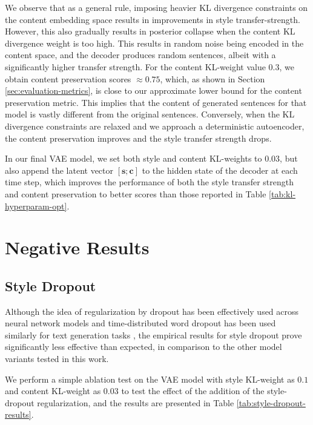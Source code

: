 We observe that as a general rule, imposing heavier KL divergence constraints on the content embedding space results in improvements in style transfer-strength. However, this also gradually results in posterior collapse when the content KL divergence weight is too high. This results in random noise being encoded in the content space, and the decoder produces random sentences, albeit with a significantly higher transfer strength. For the content KL-weight value 0.3, we obtain content preservation scores $\approx 0.75$, which, as shown in Section \ref{sec:evaluation-metrics}, is close to our approximate lower bound for the content preservation metric. This implies that the content of generated sentences for that model is vastly different from the original sentences. Conversely, when the KL divergence constraints are relaxed and we approach a deterministic autoencoder, the content preservation improves and the style transfer strength drops.

In our final VAE model, we set both style and content KL-weights to $0.03$, but also append the latent vector $[\bm s; \bm c]$ to the hidden state of the decoder at each time step, which improves the performance of both the style transfer strength and content preservation to better scores than those reported in Table \ref{tab:kl-hyperparam-opt}.


\section{Negative Results}

\subsection{Style Dropout}

Although the idea of regularization by dropout \citep{srivastava2014dropout} has been effectively used across neural network models and time-distributed word dropout has been used similarly for text generation tasks \citep{dai2015semi, bowman2016generating}, the empirical results for style dropout prove significantly less effective than expected, in comparison to the other model variants tested in this work.

We perform a simple ablation test on the VAE model with style KL-weight as $0.1$ and content KL-weight as $0.03$ to test the effect of the addition of the style-dropout regularization, and the results are presented in Table \ref{tab:style-dropout-results}.

